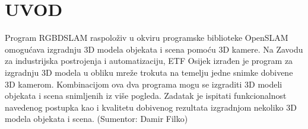 \newpage

\setcounter{page}{1}
\setcounter{figure}{0}
\section{{\MakeUppercase{\textbf{Uvod}}}} %
\label{sec:Uvod}


Program RGBDSLAM raspoloživ u okviru programske biblioteke OpenSLAM
omogućava izgradnju 3D modela objekata i scena pomoću 3D kamere. Na
Zavodu za industrijska postrojenja i automatizaciju, ETF Osijek izrađen
je program za izgradnju 3D modela u obliku mreže trokuta na temelju
jedne snimke dobivene 3D kamerom. Kombinacijom ova dva programa mogu se
izgraditi 3D modeli objekata i scena snimljenih iz više pogleda. Zadatak
je ispitati funkcionalnost navedenog postupka kao i kvalitetu dobivenog
rezultata izgradnjom nekoliko 3D modela objekata i scena. (Sumentor:
Damir Filko)

